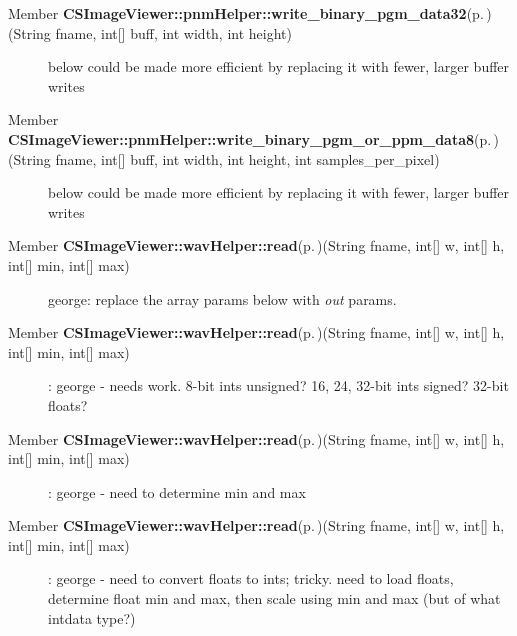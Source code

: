 \label{todo__todo000008}
 \begin{description}
\item[Member {\bf CSImage\-Viewer::pnm\-Helper::write\_\-binary\_\-pgm\_\-data32}{\rm (p.\,\pageref{class_c_s_image_viewer_1_1pnm_helper_37c7b83d8f17d8e3c8a8ecafe511d070})}(String fname, int\mbox{[}\mbox{]} buff, int width, int height) ]below could be made more efficient by replacing it with fewer, larger buffer writes \end{description}


\label{todo__todo000006}
 \begin{description}
\item[Member {\bf CSImage\-Viewer::pnm\-Helper::write\_\-binary\_\-pgm\_\-or\_\-ppm\_\-data8}{\rm (p.\,\pageref{class_c_s_image_viewer_1_1pnm_helper_60a4449366845ae713e39edda7adfed1})}(String fname, int\mbox{[}\mbox{]} buff, int width, int height, int samples\_\-per\_\-pixel) ]below could be made more efficient by replacing it with fewer, larger buffer writes \end{description}


\label{todo__todo000009}
 \begin{description}
\item[Member {\bf CSImage\-Viewer::wav\-Helper::read}{\rm (p.\,\pageref{class_c_s_image_viewer_1_1wav_helper_4589e2b0a539d4d8967a87103d03618a})}(String fname, int\mbox{[}\mbox{]} w, int\mbox{[}\mbox{]} h, int\mbox{[}\mbox{]} min, int\mbox{[}\mbox{]} max) ]george: replace the array params below with {\em out\/} params. \end{description}


\label{todo__todo000009}
 \begin{description}
\item[Member {\bf CSImage\-Viewer::wav\-Helper::read}{\rm (p.\,\pageref{class_c_s_image_viewer_1_1wav_helper_4589e2b0a539d4d8967a87103d03618a})}(String fname, int\mbox{[}\mbox{]} w, int\mbox{[}\mbox{]} h, int\mbox{[}\mbox{]} min, int\mbox{[}\mbox{]} max) ]: george - needs work. 8-bit ints unsigned? 16, 24, 32-bit ints signed? 32-bit floats? \end{description}


\label{todo__todo000009}
 \begin{description}
\item[Member {\bf CSImage\-Viewer::wav\-Helper::read}{\rm (p.\,\pageref{class_c_s_image_viewer_1_1wav_helper_4589e2b0a539d4d8967a87103d03618a})}(String fname, int\mbox{[}\mbox{]} w, int\mbox{[}\mbox{]} h, int\mbox{[}\mbox{]} min, int\mbox{[}\mbox{]} max) ]: george - need to determine min and max \end{description}


\label{todo__todo000009}
 \begin{description}
\item[Member {\bf CSImage\-Viewer::wav\-Helper::read}{\rm (p.\,\pageref{class_c_s_image_viewer_1_1wav_helper_4589e2b0a539d4d8967a87103d03618a})}(String fname, int\mbox{[}\mbox{]} w, int\mbox{[}\mbox{]} h, int\mbox{[}\mbox{]} min, int\mbox{[}\mbox{]} max) ]: george - need to convert floats to ints; tricky. need to load floats, determine float min and max, then scale using min and max (but of what intdata type?) \end{description}
